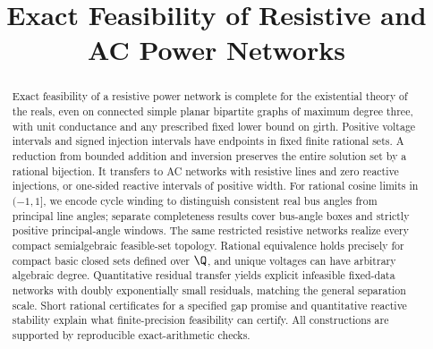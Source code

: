 \documentclass[11pt]{article}
\title{Exact Feasibility of Resistive and AC Power Networks}
\author{}
\date{}
\begin{document}
\maketitle
\begin{abstract}
Exact feasibility of a resistive power network is complete for the existential
theory of the reals, even on connected simple planar bipartite graphs of
maximum degree three, with unit conductance and any prescribed fixed lower
bound on girth.
Positive voltage intervals and signed injection intervals have endpoints in
fixed finite rational sets. A reduction from bounded addition and inversion
preserves the entire solution set by a rational bijection. It transfers to
AC networks with resistive lines and zero reactive injections, or one-sided
reactive intervals of positive width. For rational cosine limits in $(-1,1]$, we encode cycle winding to distinguish consistent real
bus angles from principal line angles; separate completeness results cover
bus-angle boxes and strictly positive principal-angle windows.
The same restricted resistive networks realize every compact semialgebraic
feasible-set topology. Rational equivalence holds precisely for compact basic
closed sets defined over $\Q$, and unique voltages can have arbitrary algebraic
degree. Quantitative residual transfer yields explicit infeasible fixed-data
networks with doubly exponentially small residuals, matching the general
separation scale. Short rational certificates for a specified gap promise and
quantitative reactive stability explain what finite-precision feasibility can
certify. All constructions are supported by reproducible exact-arithmetic
checks.
\end{abstract}








\appendix


\begingroup
\small


\endgroup
\end{document}
